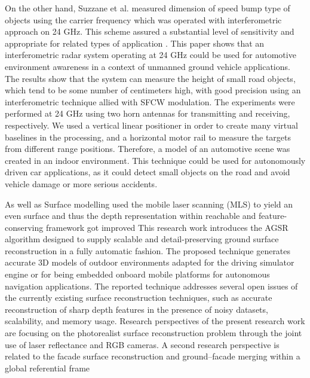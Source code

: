 \noindent
On the other hand, Suzzane et al. measured dimension of speed bump type of objects using the carrier frequency which was operated with interferometric approach on 24 GHz. This scheme assured a substantial level of sensitivity and appropriate for related types of application \cite{R19}.
This paper shows that an interferometric radar system operating at 24 GHz could be used for
automotive environment awareness in a context of unmanned ground vehicle applications.
The results show that the system can measure the height of small road objects, which tend to
be some number of centimeters high, with good precision using an interferometric technique
allied with SFCW modulation.
The experiments were performed at 24 GHz using two horn antennas for transmitting and
receiving, respectively. We used a vertical linear positioner in order to create many virtual
baselines in the processing, and a horizontal motor rail to measure the targets from different
range positions. Therefore, a model of an automotive scene was created in an indoor
environment. This technique could be used for autonomously driven car applications, as it could
detect small objects on the road and avoid vehicle damage or more serious accidents.




\noindent
As well as 
Surface modelling used the mobile laser scanning (MLS) to yield an even surface and thus the depth representation within reachable and feature-conserving framework got improved \cite{R20}This research work introduces the AGSR algorithm designed to supply scalable and detail-preserving ground surface reconstruction in a fully automatic fashion. 
\noindent
The
proposed technique generates accurate 3D models of outdoor environments adapted for the driving simulator
engine or for being embedded onboard mobile platforms
for autonomous navigation applications.
The reported technique addresses several open issues of
the currently existing surface reconstruction techniques,
such as accurate reconstruction of sharp depth features in
the presence of noisy datasets, scalability, and memory
usage.
Research perspectives of the present research work are
focusing on the photorealist surface reconstruction problem through the joint use of laser reflectance and RGB
cameras. A second research perspective is related to the
facade surface reconstruction and ground–facade merging
within a global referential frame






